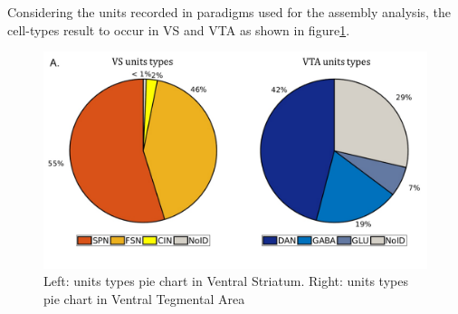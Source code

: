 Considering the units recorded in paradigms used for the assembly analysis, the cell-types result to occur in VS and VTA as shown in figure\ref{fig:PieRegions}.
\begin{figure}
  \centering
    \includegraphics[scale=0.5]{figures/PieRegions1.pdf}
   \caption{Left: units types pie chart in Ventral Striatum. Right: units types pie chart in Ventral Tegmental Area}
    \label{fig:PieRegions}
\end{figure}

